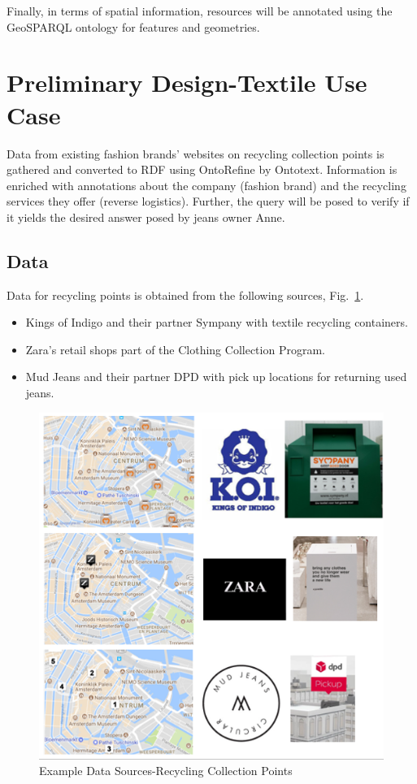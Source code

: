 \documentclass[runningheads,a4paper]{llncs}
\makeatletter
\def\maxwidth#1{\ifdim\Gin@nat@width>#1 #1\else\Gin@nat@width\fi}
\makeatother
\begin{document}
Finally, in terms of spatial information, resources will be annotated using the GeoSPARQL ontology  \cite{_Ref490914834} for features and geometries. 

\section{Preliminary Design-Textile Use Case}

Data from existing fashion brands' websites on recycling collection points is gathered and converted to RDF using OntoRefine by Ontotext.  Information is enriched with annotations about the company (fashion brand) and the recycling services they offer (reverse logistics). Further, the query will be posed to verify if it yields the desired answer posed by jeans owner Anne.  

\subsection{Data}

Data for recycling points is obtained from the following sources, Fig.~\ref{_Ref490913683}.
\begin{itemize}
\item Kings of Indigo and their partner Sympany with textile recycling containers.
\item Zara's retail shops part of the Clothing Collection Program.
\item Mud Jeans and their partner DPD with pick up locations for returning used jeans.
\end{itemize}
\begin{figure}[h!]
\centering
\includegraphics[width=\maxwidth{\textwidth}]{./img/image3.png}
\cprotect\caption{Example Data Sources-Recycling Collection Points}
\label{_Ref490913683}
\end{figure}
\end{document}
